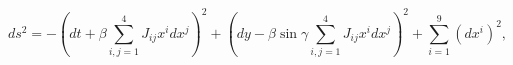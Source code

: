 \begin{equation}
\label{metn2mix}
ds^2 = - \left( dt + \beta \sum_{i,j=1}^{4} J_{ij} x^i dx^j \right)^2
+ \left( dy - \beta \sin \gamma \sum_{i,j=1}^{4} J_{ij} x^i dx^j \right)^2 
+ \sum_{i=1}^9 (dx^i)^2, 
\end{equation}

